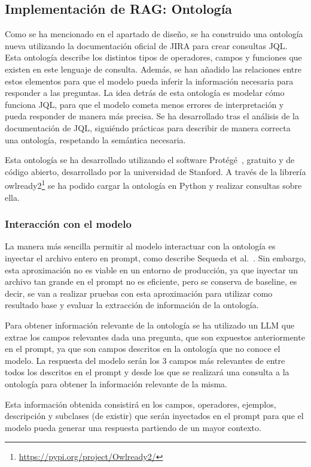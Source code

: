 \subsection{Implementación de RAG: Ontología}
Como se ha mencionado en el apartado de diseño, se ha construido una ontología nueva utilizando la documentación oficial de JIRA para crear consultas JQL. Esta ontología describe los distintos tipos de operadores, campos y funciones que existen en este lenguaje de consulta. Además, se han añadido las relaciones entre estos elementos para que el modelo pueda inferir la información necesaria para responder a las preguntas. La idea detrás de esta ontología es modelar cómo funciona JQL, para que el modelo cometa menos errores de interpretación y pueda responder de manera más precisa. Se ha desarrollado tras el análisis de la documentación de JQL, siguiéndo prácticas para describir de manera correcta una ontología, respetando la semántica necesaria.

Esta ontología se ha desarrollado utilizando el software Protégé~\cite{protege}, gratuito y de código abierto, desarrollado por la universidad de Stanford. A través de la librería owlready2\footnote{\url{https://pypi.org/project/Owlready2/}} se ha podido cargar la ontología en Python y realizar consultas sobre ella. 

\subsubsection{Interacción con el modelo}
La manera más sencilla permitir al modelo interactuar con la ontología es inyectar el archivo entero en prompt, como describe Sequeda et al.~\cite{sequeda2023benchmark}. Sin embargo, esta aproximación no es viable en un entorno de producción, ya que inyectar un archivo tan grande en el prompt no es eficiente, pero se conserva de baseline, es decir, se van a realizar pruebas con esta aproximación para utilizar como resultado base y evaluar la extracción de información de la ontología. 

Para obtener información relevante de la ontología se ha utilizado un LLM que extrae los campos relevantes dada una pregunta, que son expuestos anteriormente en el prompt, ya que son campos descritos en la ontología que no conoce el modelo. La respuesta del modelo serán los 3 campos más relevantes de entre todos los descritos en el prompt y desde los que se realizará una consulta a la ontología para obtener la información relevante de la misma.

Esta información obtenida consistirá en los campos, operadores, ejemplos, descripción y subclases (de existir) que serán inyectados en el prompt para que el modelo pueda generar una respuesta partiendo de un mayor contexto.

